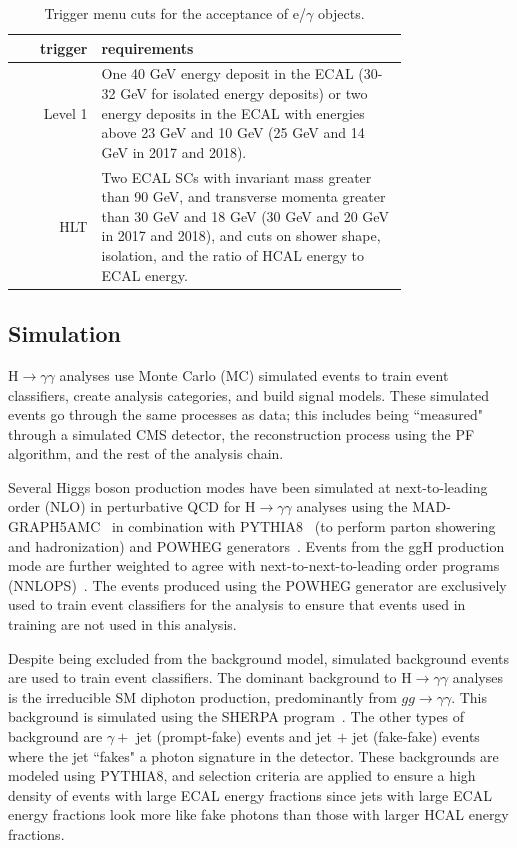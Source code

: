 \begin{table}[htbp]
    \renewcommand{\arraystretch}{1.5} %

    \centering
    \begin{tabular}{|r | p{0.78\linewidth}|}
    \hline
    trigger & requirements \\ \hline \hline
    Level 1 & One 40 GeV energy deposit in the ECAL (30-32 GeV for isolated energy deposits) or two energy deposits in the ECAL with energies above 23 GeV and 10 GeV (25 GeV and 14 GeV in 2017 and 2018). \\ \hline
    HLT & Two ECAL SCs with invariant mass greater than 90 GeV, and transverse momenta greater than 30 GeV and 18 GeV (30 GeV and 20 GeV in 2017 and 2018), and cuts on shower shape, isolation, and the ratio of HCAL energy to ECAL energy. \\ \hline
    \end{tabular}
    \caption{Trigger menu cuts for the acceptance of e/$\gamma$ objects.}
    \label{tab:double_eg_trigger}
\end{table}


\subsection{Simulation}

H$\rightarrow\gamma\gamma$ analyses use Monte Carlo (MC) simulated events to train event classifiers, create analysis categories, and build signal models. These simulated events go through the same processes as data; this includes being ``measured" through a simulated CMS detector, the reconstruction process using the PF algorithm, and the rest of the analysis chain. 

Several Higgs boson production modes have been simulated at next-to-leading order (NLO) in perturbative QCD for H$\rightarrow\gamma\gamma$ analyses using the MAD-GRAPH5\textunderscore AMC\@NLO~\cite{amcatnlo} in combination with PYTHIA8~\cite{pythia} (to perform parton showering and hadronization) and POWHEG generators~\cite{powheg}. Events from the ggH production mode are further weighted to agree with next-to-next-to-leading order programs (NNLOPS)~\cite{nnlops}. The events produced using the POWHEG generator are exclusively used to train event classifiers for the analysis to ensure that events used in training are not used in this analysis.

Despite being excluded from the background model, simulated background events are used to train event classifiers. The dominant background to H$\rightarrow\gamma\gamma$ analyses is the irreducible SM diphoton production, predominantly from $gg\rightarrow\gamma\gamma$. This background is simulated using the SHERPA program~\cite{sherpa}. The other types of background are $\gamma +$ jet (prompt-fake) events and jet $+$ jet (fake-fake) events where the jet ``fakes" a photon signature in the detector. These backgrounds are modeled using PYTHIA8, and selection criteria are applied to ensure a high density of events with large ECAL energy fractions since jets with large ECAL energy fractions look more like fake photons than those with larger HCAL energy fractions.


